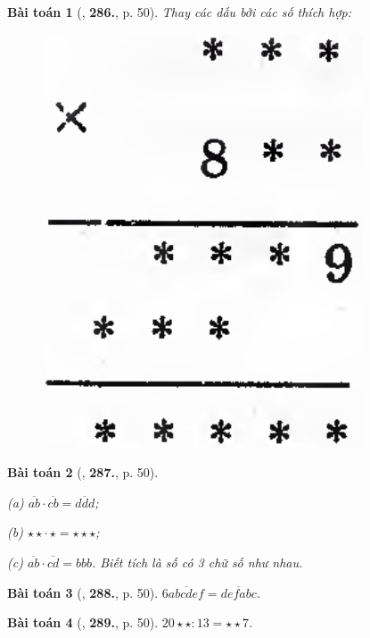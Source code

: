 \documentclass{article}
\numberwithin{equation}{section}
\newtheorem{baitoan}{Bài toán}
\begin{document}
\begin{baitoan}[\cite{Binh_Toan_6_tap_1}, \textbf{286.}, p. 50]
	Thay các dấu {\bf*} bởi các số thích hợp:
	\begin{figure}[H]
		\centering
		\includegraphics[scale=0.13]{Binh_286_p_50}
	\end{figure}
\end{baitoan}

\begin{baitoan}[\cite{Binh_Toan_6_tap_1}, \textbf{287.}, p. 50]
	\begin{enumerate*}
		\item[(a)] $\overline{ab}\cdot\overline{cb} = \overline{ddd}$;
		\item[(b)] $\star\star\cdot\,\star = \star\star\star$;
		\item[(c)] $\overline{ab}\cdot\overline{cd} = bbb$. Biết tích là số có 3 chữ số như nhau.
	\end{enumerate*}
\end{baitoan}

\begin{baitoan}[\cite{Binh_Toan_6_tap_1}, \textbf{288.}, p. 50]
	$6\overline{abcdef} = \overline{defabc}$.
\end{baitoan}

\begin{baitoan}[\cite{Binh_Toan_6_tap_1}, \textbf{289.}, p. 50]
	$20\star\star:13 = \star\star7$.
\end{baitoan}
\end{document}
